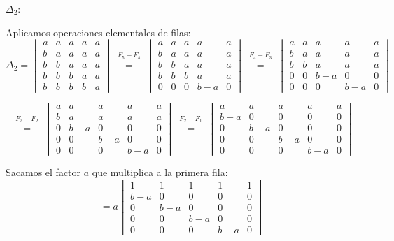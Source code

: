 \documentclass[a4paper,12pt]{article}
\begin{document}
\begin{ejercicio}[title=Ejercicio 40]
$\Delta_2$:

\vspace{0.5em}

Aplicamos operaciones elementales de filas:
\[
\Delta_2 =
\begin{vmatrix}
a & a & a & a & a\\
b & a & a & a & a\\
b & b & a & a & a\\
b & b & b & a & a\\
b & b & b & b & a
\end{vmatrix}
\overset{\substack{F_5-F_4\\{}}}{=}
\begin{vmatrix}
a & a & a & a & a\\
b & a & a & a & a\\
b & b & a & a & a\\
b & b & b & a & a\\
0 & 0 & 0 & b-a & 0
\end{vmatrix}
\overset{\substack{F_4-F_3\\{}}}{=}
\begin{vmatrix}
a & a & a & a & a\\
b & a & a & a & a\\
b & b & a & a & a\\
0 & 0 & b-a & 0 & 0\\
0 & 0 & 0 & b-a & 0
\end{vmatrix}
\]

\[
\overset{\substack{F_3-F_2\\{}}}{=}
\begin{vmatrix}
a & a & a & a & a\\
b & a & a & a & a\\
0 & b-a & 0 & 0 & 0\\
0 & 0 & b-a & 0 & 0\\
0 & 0 & 0 & b-a & 0
\end{vmatrix}
\overset{\substack{F_2-F_1\\{}}}{=}
\begin{vmatrix}
a & a & a & a & a\\
b-a & 0 & 0 & 0 & 0\\
0 & b-a & 0 & 0 & 0\\
0 & 0 & b-a & 0 & 0\\
0 & 0 & 0 & b-a & 0
\end{vmatrix}
\]

Sacamos el factor $a$ que multiplica a la primera fila:
\[
= a
\begin{vmatrix}
1 & 1 & 1 & 1 & 1\\
b-a & 0 & 0 & 0 & 0\\
0 & b-a & 0 & 0 & 0\\
0 & 0 & b-a & 0 & 0\\
0 & 0 & 0 & b-a & 0
\end{vmatrix}
\]


\end{ejercicio}
\end{document}

